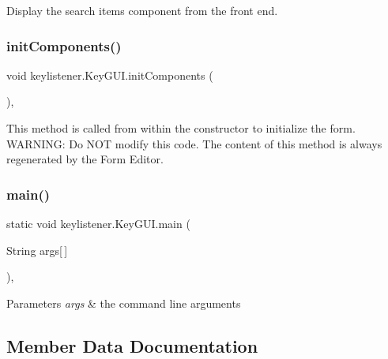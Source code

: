 Display the search item\textquotesingle{}s component from the front end. \mbox{\label{classkeylistener_1_1_key_g_u_i_a43be7b88fdba1420ee3f0d1c2c4c2748}} 
\subsubsection{\texorpdfstring{init\+Components()}{initComponents()}}
{\footnotesize\ttfamily void keylistener.\+Key\+G\+U\+I.\+init\+Components (\begin{DoxyParamCaption}{ }\end{DoxyParamCaption})\hspace{0.3cm}{\ttfamily [inline]}, {\ttfamily [private]}}

This method is called from within the constructor to initialize the form. W\+A\+R\+N\+I\+NG\+: Do N\+OT modify this code. The content of this method is always regenerated by the Form Editor. \mbox{\label{classkeylistener_1_1_key_g_u_i_ac0043858e116673e920af7f1542f5376}} 
\subsubsection{\texorpdfstring{main()}{main()}}
{\footnotesize\ttfamily static void keylistener.\+Key\+G\+U\+I.\+main (\begin{DoxyParamCaption}\item[{String}]{args\mbox{[}$\,$\mbox{]} }\end{DoxyParamCaption})\hspace{0.3cm}{\ttfamily [inline]}, {\ttfamily [static]}}


\begin{DoxyParams}{Parameters}
{\em args} & the command line arguments \\
\hline
\end{DoxyParams}


\subsection{Member Data Documentation}
\mbox{\label{classkeylistener_1_1_key_g_u_i_ad2118979cc01e139f390529e68561b36}} 
